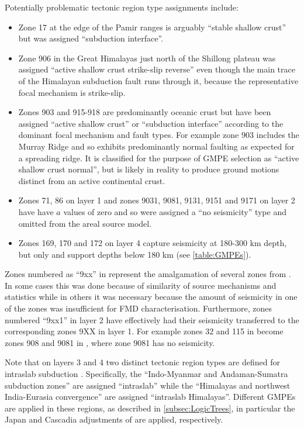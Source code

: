 \documentclass{article}
\begin{document}
Potentially problematic tectonic region type assignments include:
\begin{itemize}
\item Zone 17 at the edge of the Pamir ranges is arguably ``stable shallow crust'' but was assigned ``subduction interface''.
\item Zone 906 in the Great Himalayas just north of the Shillong plateau was assigned ``active shallow crust strike-slip reverse'' even though the main trace of the Himalayan subduction fault runs through it, because the representative focal mechanism is strike-slip.
\item Zones 903 and 915-918 are predominantly oceanic crust but have been assigned ``active shallow crust'' or ``subduction interface'' according to the dominant focal mechanism and fault types.
For example zone 903 includes the Murray Ridge and so exhibits predominantly normal faulting as expected for a spreading ridge.
It is classified for the purpose of GMPE selection as ``active shallow crust normal'', but is likely in reality to produce ground motions distinct from an active continental crust.
\item Zones 71, 86 on layer 1 and zones 9031, 9081, 9131, 9151 and 9171 on layer 2 have have $a$ values of zero and so were assigned a ``no seismicity'' type and omitted from the areal source model.
\item Zones 169, 170 and 172 on layer 4 capture seismicity at 180-300 km depth, but only \cite{youngs1997strong} and \cite{kanno2006new} support depths below 180 km (see \autoref{table:GMPEs}).
\end{itemize}

Zones numbered as ``9xx'' in \cite{nath2012probabilistic} represent the amalgamation of several zones from \cite{thingbaijam2011seismogenic}.
In some cases this was done because of similarity of source mechanisms and statistics while in others it was necessary because the amount of seismicity in one of the zones was insufficient for FMD characterisation.
Furthermore, zones numbered ``9xx1'' in layer 2 have effectively had their seismicity transferred to the corresponding zones 9XX in layer 1.
For example zones 32 and 115 in \cite{thingbaijam2011seismogenic} become zones 908 and 9081 in \cite{nath2012probabilistic}, where zone 9081 has no seismicity.

Note that on layers 3 and 4 two distinct tectonic region types are defined for intraslab subduction \citep[p.
137]{nath2012probabilistic}.
Specifically, the ``Indo-Myanmar and Andaman-Sumatra subduction zones'' are assigned ``intraslab'' while the ``Himalayas and northwest India-Eurasia convergence'' are assigned ``intraslab Himalayas''.
Different GMPEs are applied in these regions, as described in \autoref{subsec:LogicTrees}, in particular the Japan and Cascadia adjustments of \cite{atkinson2003empirical} are applied, respectively.
\end{document}
